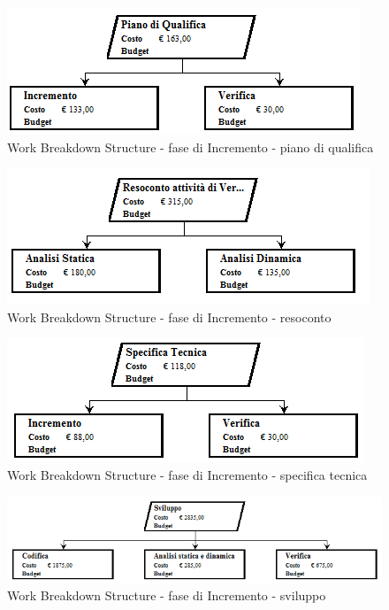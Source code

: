 \documentclass[a4paper]{article}
\begin{document}
				\begin{figure}[H]
					\centering
					\includegraphics[width=\textwidth]{wbs/wbs_incremento_5}
					\caption{Work Breakdown Structure - fase di Incremento - piano di qualifica}
				\end{figure}
				\begin{figure}[H]
					\centering
					\includegraphics[width=\textwidth]{wbs/wbs_incremento_6}
					\caption{Work Breakdown Structure - fase di Incremento - resoconto}
				\end{figure}
				\begin{figure}[H]
					\centering
					\includegraphics[width=\textwidth]{wbs/wbs_incremento_7}
					\caption{Work Breakdown Structure - fase di Incremento - specifica tecnica}
				\end{figure}
				\begin{figure}[H]
					\centering
					\includegraphics[width=\textwidth]{wbs/wbs_incremento_8}
					\caption{Work Breakdown Structure - fase di Incremento - sviluppo}
				\end{figure}
\end{document}
